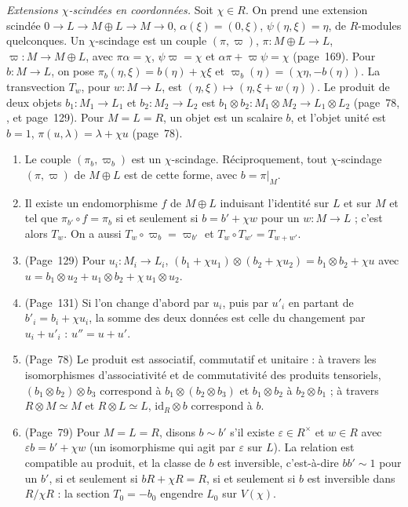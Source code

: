 \noindent\emph{Extensions $\chi$-scindées en coordonnées.} Soit $\chi \in R$. On prend une extension scindée $0 \to L \to M \oplus L \to M \to 0$, $\alpha(\xi) = (0, \xi)$, $\psi(\eta, \xi) = \eta$, de $R$-modules quelconques. Un $\chi$-scindage est un couple $(\pi, \varpi)$, $\pi : M \oplus L \to L$, $\varpi : M \to M \oplus L$, avec $\pi\alpha = \chi$, $\psi\varpi = \chi$ et $\alpha\pi + \varpi\psi = \chi$ (page~169). Pour $b : M \to L$, on pose $\pi_b(\eta, \xi) = b(\eta) + \chi\xi$ et $\varpi_b(\eta) = (\chi\eta, -b(\eta))$. La transvection $T_w$, pour $w : M \to L$, est $(\eta, \xi) \mapsto (\eta, \xi + w(\eta))$. Le produit de deux objets $b_1 : M_1 \to L_1$ et $b_2 : M_2 \to L_2$ est $b_1 \otimes b_2 : M_1 \otimes M_2 \to L_1 \otimes L_2$ (page~78, , et page~129). Pour $M = L = R$, un objet est un scalaire $b$, et l'objet unité est $b = 1$, $\pi(u, \lambda) = \lambda + \chi u$ (page~78).

\begin{enonce}\leavevmode
\begin{enumerate}
\item Le couple $(\pi_b, \varpi_b)$ est un $\chi$-scindage. Réciproquement, tout $\chi$-scindage $(\pi, \varpi)$ de $M \oplus L$ est de cette forme, avec $b = \pi|_M$.
\item Il existe un endomorphisme $f$ de $M \oplus L$ induisant l'identité sur $L$ et sur $M$ et tel que $\pi_{b'} \circ f = \pi_b$ si et seulement si $b = b' + \chi w$ pour un $w : M \to L$ ; c'est alors $T_w$. On a aussi $T_w \circ \varpi_b = \varpi_{b'}$ et $T_w \circ T_{w'} = T_{w + w'}$.
\item (Page~129) Pour $u_i : M_i \to L_i$, $(b_1 + \chi u_1) \otimes (b_2 + \chi u_2) = b_1 \otimes b_2 + \chi u$ avec $u = b_1 \otimes u_2 + u_1 \otimes b_2 + \chi\, u_1 \otimes u_2$.
\item (Page~131) Si l'on change d'abord par $u_i$, puis par $u'_i$ en partant de $b'_i = b_i + \chi u_i$, la somme des deux données est celle du changement par $u_i + u'_i$ : $u'' = u + u'$.
\item (Page~78) Le produit est associatif, commutatif et unitaire : à travers les isomorphismes d'associativité et de commutativité des produits tensoriels, $(b_1 \otimes b_2) \otimes b_3$ correspond à $b_1 \otimes (b_2 \otimes b_3)$ et $b_1 \otimes b_2$ à $b_2 \otimes b_1$ ; à travers $R \otimes M \simeq M$ et $R \otimes L \simeq L$, $\mathrm{id}_R \otimes b$ correspond à $b$.
\item (Page~79) Pour $M = L = R$, disons $b \sim b'$ s'il existe $\varepsilon \in R^\times$ et $w \in R$ avec $\varepsilon b = b' + \chi w$ (un isomorphisme qui agit par $\varepsilon$ sur $L$). La relation est compatible au produit, et la classe de $b$ est inversible, c'est-à-dire $bb' \sim 1$ pour un $b'$, si et seulement si $bR + \chi R = R$, si et seulement si $b$ est inversible dans $R/\chi R$ : la section $T_0 = -b_0$ engendre $L_0$ sur $V(\chi)$.
\end{enumerate}
\end{enonce}

